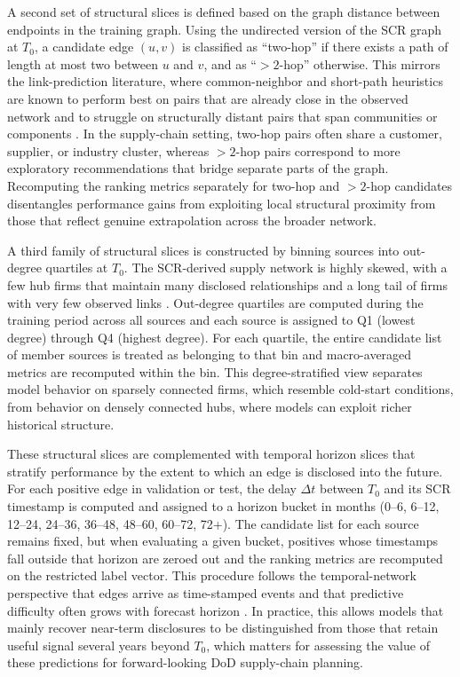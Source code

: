 A second set of structural slices is defined based on the graph distance between endpoints in the training graph. Using the undirected version of the SCR graph at $T_0$, a candidate edge $(u,v)$ is classified as ``two-hop'' if there exists a path of length at most two between $u$ and $v$, and as ``$>2$-hop'' otherwise. This mirrors the link-prediction literature, where common-neighbor and short-path heuristics are known to perform best on pairs that are already close in the observed network and to struggle on structurally distant pairs that span communities or components \parencite{liben-nowell_link_2003,lu_link_2011}. In the supply-chain setting, two-hop pairs often share a customer, supplier, or industry cluster, whereas $>2$-hop pairs correspond to more exploratory recommendations that bridge separate parts of the graph. Recomputing the ranking metrics separately for two-hop and $>2$-hop candidates disentangles performance gains from exploiting local structural proximity from those that reflect genuine extrapolation across the broader network.

A third family of structural slices is constructed by binning sources into out-degree quartiles at $T_0$. The SCR-derived supply network is highly skewed, with a few hub firms that maintain many disclosed relationships and a long tail of firms with very few observed links \parencite{barabasi_emergence_1999}. Out-degree quartiles are computed during the training period across all sources and each source is assigned to Q1 (lowest degree) through Q4 (highest degree). For each quartile, the entire candidate list of member sources is treated as belonging to that bin and macro-averaged metrics are recomputed within the bin. This degree-stratified view separates model behavior on sparsely connected firms, which resemble cold-start conditions, from behavior on densely connected hubs, where models can exploit richer historical structure.

These structural slices are complemented with temporal horizon slices that stratify performance by the extent to which an edge is disclosed into the future. For each positive edge in validation or test, the delay $\Delta t$ between $T_0$ and its SCR timestamp is computed and assigned to a horizon bucket in months (0--6, 6--12, 12--24, 24--36, 36--48, 48--60, 60--72, 72+). The candidate list for each source remains fixed, but when evaluating a given bucket, positives whose timestamps fall outside that horizon are zeroed out and the ranking metrics are recomputed on the restricted label vector. This procedure follows the temporal-network perspective that edges arrive as time-stamped events and that predictive difficulty often grows with forecast horizon \parencite{holme_temporal_2012}. In practice, this allows models that mainly recover near-term disclosures to be distinguished from those that retain useful signal several years beyond $T_0$, which matters for assessing the value of these predictions for forward-looking DoD supply-chain planning.

